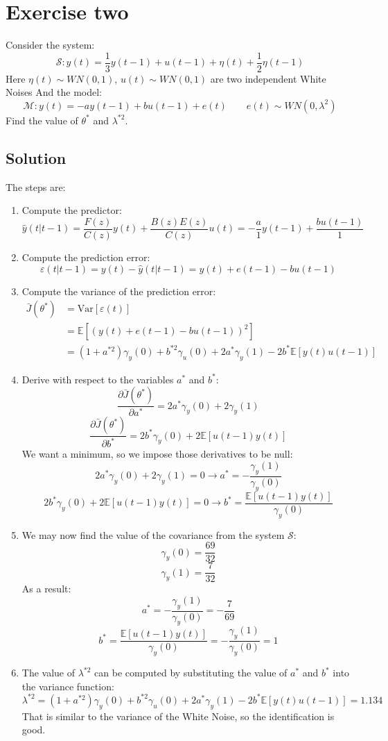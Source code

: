 \section{Exercise two}

Consider the system: 
\[\mathcal{S}:y(t)=\dfrac{1}{3}y(t-1)+u(t-1)+\eta(t)+\dfrac{1}{2}\eta(t-1)\]
Here $\eta(t)\sim WN(0,1)$, $u(t)\sim WN(0,1)$ are two independent White Noises
And the model: 
\[\mathcal{M}:y(t)=-ay(t-1)+bu(t-1)+e(t) \qquad e(t)\sim WN(0,\lambda^2)\]
Find the value of $\theta^\ast$ and $\lambda^{\ast 2}$. 

\subsection*{Solution}
The steps are: 
\begin{enumerate}
    \item Compute the predictor: 
        \[\hat{y}(t|t-1)=\dfrac{F(z)}{C(z)}y(t)+\dfrac{B(z)E(z)}{C(z)}u(t)=-\dfrac{a}{1}y(t-1)+\dfrac{bu(t-1)}{1}\]
    \item Compute the prediction error: 
        \[\varepsilon(t|t-1)=y(t)-\hat{y}(t|t-1)=y(t)+e(t-1)-bu(t-1)\]
    \item Compute the variance of the prediction error: 
        \begin{align*}
            \bar{J}(\theta^\ast)    &=\text{Var}\left[\varepsilon(t)\right]\\   
                                    &=\mathbb{E}\left[ \left(y(t)+e(t-1)-bu(t-1)\right)^2 \right] \\
                                    &=\left(1+a^{\ast 2}\right)\gamma_y(0)+b^{\ast 2}\gamma_u(0)+2a^\ast \gamma_y(1)-2b^\ast\mathbb{E}\left[y(t)u(t-1)\right]
        \end{align*}
    \item Derive with respect to the variables $a^\ast$ and $b^\ast$: 
        \[\dfrac{\partial\bar{J}(\theta^\ast)}{\partial a^\ast}=2a^\ast\gamma_y(0)+2\gamma_y(1)\]
        \[\dfrac{\partial\bar{J}(\theta^\ast)}{\partial b^\ast}=2b^\ast\gamma_y(0)+2\mathbb{E}\left[u(t-1)y(t)\right]\]
        We want a minimum, so we impose those derivatives to be null: 
        \[2a^\ast\gamma_y(0)+2\gamma_y(1)=0 \rightarrow a^\ast=-\dfrac{\gamma_y(1)}{\gamma_y(0)}\]
        \[2b^\ast\gamma_y(0)+2\mathbb{E}\left[u(t-1)y(t)\right]=0 \rightarrow b^\ast=\dfrac{\mathbb{E}\left[u(t-1)y(t)\right]}{\gamma_y(0)}\]
    \item We may now find the value of the covariance from the system $\mathcal{S}$: 
        \[\gamma_y(0)=\dfrac{69}{32}\]
        \[\gamma_y(1)=\dfrac{7}{32}\]
        As a result: 
        \[a^\ast=-\dfrac{\gamma_y(1)}{\gamma_y(0)}=-\dfrac{7}{69}\]
        \[b^\ast=\dfrac{\mathbb{E}\left[u(t-1)y(t)\right]}{\gamma_y(0)}=-\dfrac{\gamma_y(1)}{\gamma_y(0)}=1\]
    \item The value of $\lambda^{\ast 2}$ can be computed by substituting the value of $a^\ast$ and $b^\ast$ into the variance function: 
        \[\lambda^{\ast 2}=\left(1+a^{\ast 2}\right)\gamma_y(0)+b^{\ast 2}\gamma_u(0)+2a^\ast\gamma_y(1)-2b^\ast\mathbb{E}\left[y(t)u(t-1)\right]=1.134\]
        That is similar to the variance of the White Noise, so the identification is good. 
\end{enumerate}